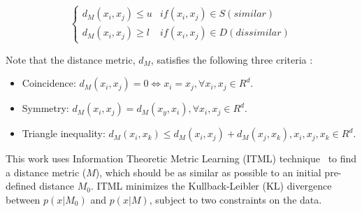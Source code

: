 \begin{equation}
	\left\{\begin{matrix}
		d_{M}(x_{i},x_{j}) \leq u & if (x_{i},x_{j}) \in S(similar)    \\
		d_{M}(x_{i},x_{j}) \geq l & if (x_{i},x_{j}) \in D(dissimilar)
	\end{matrix}\right.
\end{equation}

Note that the distance metric, $d_{M}$, satisfies the following three criteria
\cite{suarez2020tutorial}:

\begin{itemize}
	\item Coincidence: $ d_{M}(x_{i},x_{j})=0 \Leftrightarrow x_{i} =x_{j} ,
		      \forall x_{i},x_{j} \in R^{d} $.
	\item Symmetry: $ d_{M}(x_{i},x_{j})=d_{M}(x_{y},x_{i}) , \forall
		      x_{i},x_{j} \in R^{d} $.
	\item Triangle inequality: $d_{M}(x_{i},x_{k})\leq d_{M}(x_{i},x_{j}) +
		      d_{M}(x_{j},x_{k}) , x_{i},x_{j},x_{k} \in R^{d}$.
\end{itemize}

This work uses Information Theoretic Metric Learning (ITML)
technique~\cite{davis2007information}  to find a distance metric ($M$), which
should be as similar as possible to an initial pre-defined distance $M_{0}$.
ITML minimizes the Kullback-Leibler (KL) divergence~\cite{shlens2014notes}
between $p(x|M_{0})$ and $p(x|M)$, subject to two constraints on the data.

